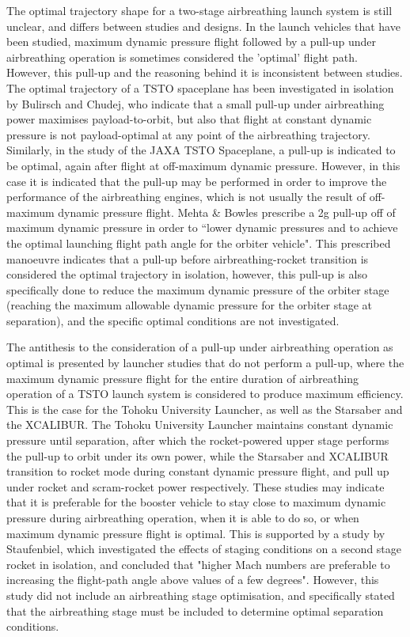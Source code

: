 The optimal trajectory shape for a two-stage airbreathing launch system is still unclear, and differs between studies and designs. 
In the launch vehicles that have been studied, maximum dynamic pressure flight followed by a pull-up under airbreathing operation is sometimes considered the 'optimal' flight path\cite{Bulirsch1995,Fujikawa2017,Mehta2001}. However, this pull-up and the reasoning behind it is inconsistent between studies.
The optimal trajectory of a TSTO spaceplane has been investigated in isolation by Bulirsch and Chudej\cite{Bulirsch1995}, who indicate that a small pull-up under airbreathing power maximises payload-to-orbit, but also that flight at constant dynamic pressure is not payload-optimal at any point of the airbreathing trajectory. Similarly, in the study of the JAXA TSTO Spaceplane\cite{Fujikawa2017}, a pull-up is indicated to be optimal, again after flight at off-maximum dynamic pressure. However, in this case it is indicated that the pull-up may be performed in order to improve the performance of the airbreathing engines, which is not usually the result of off- maximum dynamic pressure flight. 
Mehta \& Bowles\cite{Mehta2001} prescribe a 2g pull-up off of maximum dynamic pressure in order to ``lower dynamic pressures and to achieve the optimal launching flight path angle for the orbiter vehicle". This prescribed manoeuvre indicates that a pull-up before airbreathing-rocket transition is considered the optimal trajectory in isolation, however, this pull-up is also specifically done to reduce the maximum dynamic pressure of the orbiter stage (reaching the maximum allowable dynamic pressure for the orbiter stage at separation), and the specific optimal conditions are not investigated. 

The antithesis to the consideration of a pull-up under airbreathing operation as optimal is presented by launcher studies that do not perform a pull-up, where the maximum dynamic pressure flight for the entire duration of airbreathing operation of a TSTO launch system is considered to produce maximum efficiency. 
 This is the case for the Tohoku University Launcher\cite{Takahashi1997}, as well as the Starsaber\cite{Germain2001} and the XCALIBUR\cite{Bradford2002}. The Tohoku University Launcher maintains constant dynamic pressure until separation, after which the rocket-powered upper stage performs the pull-up to orbit under its own power, while the Starsaber and XCALIBUR transition to rocket mode during constant dynamic pressure flight, and pull up under rocket and scram-rocket power respectively. These studies may indicate that it is preferable for the booster vehicle to stay close to maximum dynamic pressure during airbreathing operation, when it is able to do so, or when maximum dynamic pressure flight is optimal. This is supported by a study by Staufenbiel\cite{Staufenbiel2000}, which investigated the effects of staging conditions on a second stage rocket in isolation, and concluded that "higher Mach numbers are preferable to increasing the flight-path angle above values of a few degrees". However, this study did not include an airbreathing stage optimisation, and specifically stated that the airbreathing stage must be included to determine optimal separation conditions\cite{Staufenbiel2000}. 


